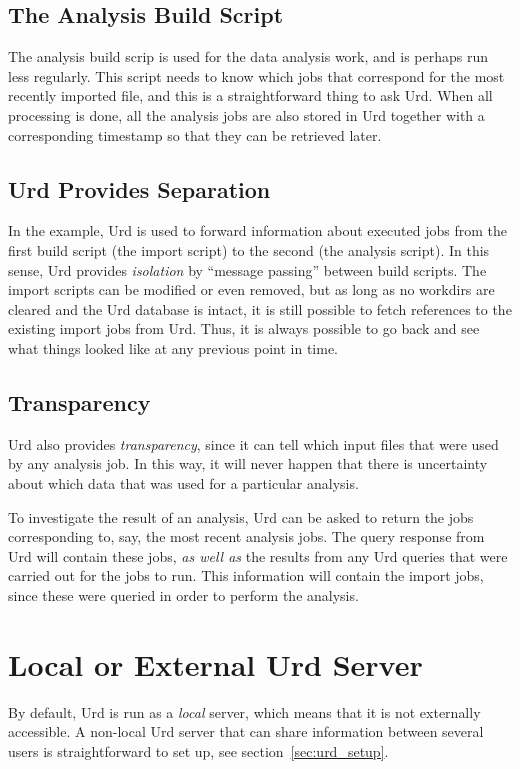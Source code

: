 \subsection{The Analysis Build Script}
The analysis build scrip is used for the data analysis work, and is
perhaps run less regularly.  This script needs to know which jobs that
correspond for the most recently imported file, and this is a
straightforward thing to ask Urd.  When all processing is done, all
the analysis jobs are also stored in Urd together with a corresponding
timestamp so that they can be retrieved later.



\subsection{Urd Provides Separation}
In the example, Urd is used to forward information about executed jobs
from the first build script (the import script) to the second (the
analysis script).  In this sense, Urd provides \textsl{isolation} by
``message passing'' between build scripts.  The import scripts can be
modified or even removed, but as long as no workdirs are cleared and
the Urd database is intact, it is still possible to fetch references
to the existing import jobs from Urd.  Thus, it is always possible to
go back and see what things looked like at any previous point in time.



\subsection{Transparency}
Urd also provides \textsl{transparency}, since it can tell which input
files that were used by any analysis job.  In this way, it will never
happen that there is uncertainty about which data that was used for a
particular analysis.

To investigate the result of an analysis, Urd can be asked to return
the jobs corresponding to, say, the most recent analysis jobs.  The
query response from Urd will contain these jobs, \textsl{as well as}
the results from any Urd queries that were carried out for the jobs to
run.  This information will contain the import jobs, since these were
queried in order to perform the analysis.





\section{Local or External Urd Server}
By default, Urd is run as a \textsl{local} server, which means that it
is not externally accessible.  A non-local Urd server that can share
information between several users is straightforward to set up, see
section~\ref{sec:urd_setup}.





